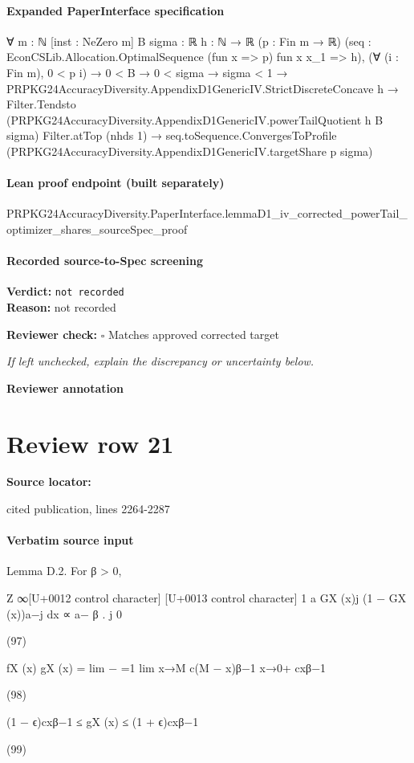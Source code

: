 \documentclass[10pt]{article}
\newcommand{\reviewerbox}{%
  \par\noindent\fbox{\parbox{0.96\linewidth}{\rule{0pt}{0.38in}}}\par
}
\newcommand{\reviewmatch}[1]{%
  \par\noindent\textbf{Reviewer check:} $\square$\; #1\par
  \noindent\emph{If left unchecked, explain the discrepancy or uncertainty below.}\par
}
\begin{document}
\paragraph{Expanded PaperInterface specification}
\begin{ReviewVerbatim}
∀ {m : ℕ} [inst : NeZero m] {B sigma : ℝ} {h : ℕ → ℝ} (p : Fin m → ℝ)
  (seq : EconCSLib.Allocation.OptimalSequence (fun x => p) fun x x_1 => h),
  (∀ (i : Fin m), 0 < p i) →
    0 < B →
      0 < sigma →
        sigma < 1 →
          PRPKG24AccuracyDiversity.AppendixD1GenericIV.StrictDiscreteConcave h →
            Filter.Tendsto (PRPKG24AccuracyDiversity.AppendixD1GenericIV.powerTailQuotient h B sigma) Filter.atTop
                (nhds 1) →
              seq.toSequence.ConvergesToProfile (PRPKG24AccuracyDiversity.AppendixD1GenericIV.targetShare p sigma)
\end{ReviewVerbatim}

\paragraph{Lean proof endpoint (built separately)}\begin{ReviewVerbatim}
PRPKG24AccuracyDiversity.PaperInterface.lemmaD1_iv_corrected_powerTail_optimizer_shares_sourceSpec_proof
\end{ReviewVerbatim}

\paragraph{Recorded source-to-Spec screening}
\textbf{Verdict:} \texttt{not recorded}
\\
\textbf{Reason:} not recorded
\reviewmatch{Matches approved corrected target}
\noindent\textbf{Reviewer annotation}\par
\reviewerbox
\clearpage
\hypertarget{source-claim-7237c50e8bcf2059}{}
\section*{Review row 21}
\textbf{Source locator:} {\footnotesize\raggedright cited publication, lines 2264-\allowbreak{}2287\par}
\paragraph{Verbatim source input}
\begin{ReviewVerbatim}
Lemma D.2. For β > 0,

Z ∞[U+0012 control character] [U+0013 control character]
1
a
GX (x)j (1 − GX (x))a−j dx ∝ a− β .
j
0

(97)

fX (x)
gX (x)
= lim −
=1
lim
x→M c(M − x)β−1
x→0+ cxβ−1

(98)

(1 − ϵ)cxβ−1 ≤ gX (x) ≤ (1 + ϵ)cxβ−1

(99)
\end{ReviewVerbatim}
\end{document}
